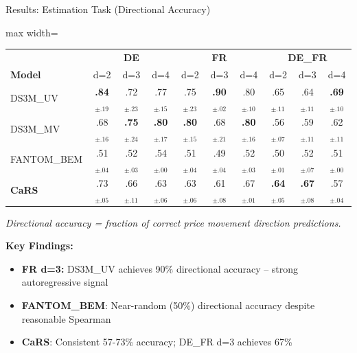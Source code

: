 \documentclass[aspectratio=169]{beamer}
\begin{document}
\begin{frame}{Results: Estimation Task (Directional Accuracy)}
\begin{table}
\centering
\small
\begin{adjustbox}{max width=\textwidth}
\begin{tabular}{l|ccc|ccc|ccc}
\toprule
& \multicolumn{3}{c|}{\textbf{DE}} & \multicolumn{3}{c|}{\textbf{FR}} & \multicolumn{3}{c}{\textbf{DE\_FR}} \\
\textbf{Model} & d=2 & d=3 & d=4 & d=2 & d=3 & d=4 & d=2 & d=3 & d=4 \\
\midrule
DS3M\_UV & \textbf{.84}$_{\pm.19}$ & .72$_{\pm.23}$ & .77$_{\pm.15}$ & .75$_{\pm.23}$ & \textbf{.90}$_{\pm.02}$ & .80$_{\pm.10}$ & .65$_{\pm.11}$ & .64$_{\pm.11}$ & \textbf{.69}$_{\pm.10}$ \\
DS3M\_MV & .68$_{\pm.16}$ & \textbf{.75}$_{\pm.24}$ & \textbf{.80}$_{\pm.17}$ & \textbf{.80}$_{\pm.15}$ & .68$_{\pm.21}$ & \textbf{.80}$_{\pm.16}$ & .56$_{\pm.07}$ & .59$_{\pm.11}$ & .62$_{\pm.11}$ \\
FANTOM\_BEM & .51$_{\pm.04}$ & .52$_{\pm.03}$ & .54$_{\pm.00}$ & .51$_{\pm.04}$ & .49$_{\pm.04}$ & .52$_{\pm.03}$ & .50$_{\pm.01}$ & .52$_{\pm.07}$ & .51$_{\pm.00}$ \\
\midrule
\textbf{CaRS} & .73$_{\pm.05}$ & .66$_{\pm.11}$ & .63$_{\pm.06}$ & .63$_{\pm.06}$ & .61$_{\pm.08}$ & .67$_{\pm.01}$ & \textbf{.64}$_{\pm.05}$ & \textbf{.67}$_{\pm.08}$ & .57$_{\pm.04}$ \\
\bottomrule
\end{tabular}
\end{adjustbox}
\end{table}

\vspace{0.2cm}
{\scriptsize \textit{Directional accuracy = fraction of correct price movement direction predictions.}}%

\vspace{0.2cm}
\textbf{Key Findings:}
\begin{itemize}
    \item \textbf{FR d=3:} DS3M\_UV achieves 90\% directional accuracy -- strong autoregressive signal
    \item \textbf{FANTOM\_BEM}: Near-random (50\%) directional accuracy despite reasonable Spearman
    \item \textbf{CaRS}: Consistent 57-73\% accuracy; DE\_FR d=3 achieves 67\%
\end{itemize}
\end{frame}
\end{document}
